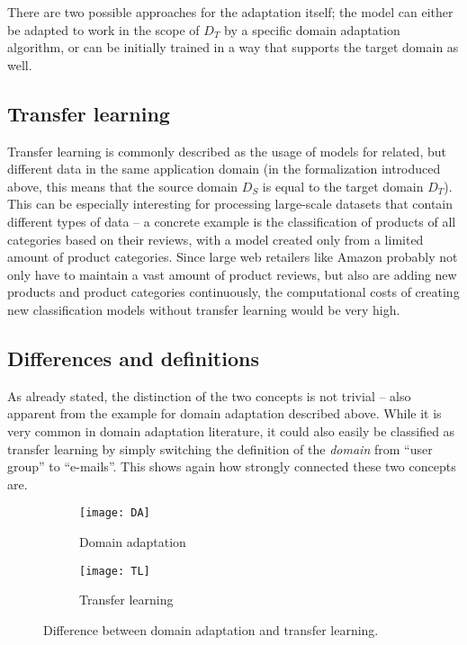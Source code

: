 There are two possible approaches for the adaptation itself; the model can either be adapted to work in the scope of $D_{T}$ by a specific domain adaptation algorithm, or can be initially trained in a way that supports the target domain as well. \cite{Patricia2014}


\subsection{Transfer learning}
Transfer learning is commonly described as the usage of models for related, but different data in the same application domain (in the formalization introduced above, this means that the source domain $D_{S}$ is equal to the target domain $D_{T}$). This can be especially interesting for processing large-scale datasets that contain different types of data -- a concrete example is the classification of products of all categories based on their reviews, with a model created only from a limited amount of product categories. Since large web retailers like Amazon probably not only have to maintain a vast amount of product reviews, but also are adding new products and product categories continuously, the computational costs of creating new classification models without transfer learning would be very high. \cite{Pan2010}



\subsection{Differences and definitions}
\label{sec:da-vs-tl}
As already stated, the distinction of the two concepts is not trivial -- also apparent from the example for domain adaptation described above. While it is very common in domain adaptation literature, it could also easily be classified as transfer learning by simply switching the definition of the \textit{domain} from ``user group'' to ``e-mails''. This shows again how strongly connected these two concepts are. 

\begin{figure}
\centering
\begin{subfigure}{.667\textwidth}
  \centering
  \texttt{[image: DA]}
  \caption{Domain adaptation}
\end{subfigure}%
\begin{subfigure}{.333\textwidth}
  \centering
  \texttt{[image: TL]}
  \caption{Transfer learning}
\end{subfigure}
\caption{Difference between domain adaptation and transfer learning.}
\label{fig:da_vs_tl}
\end{figure}

